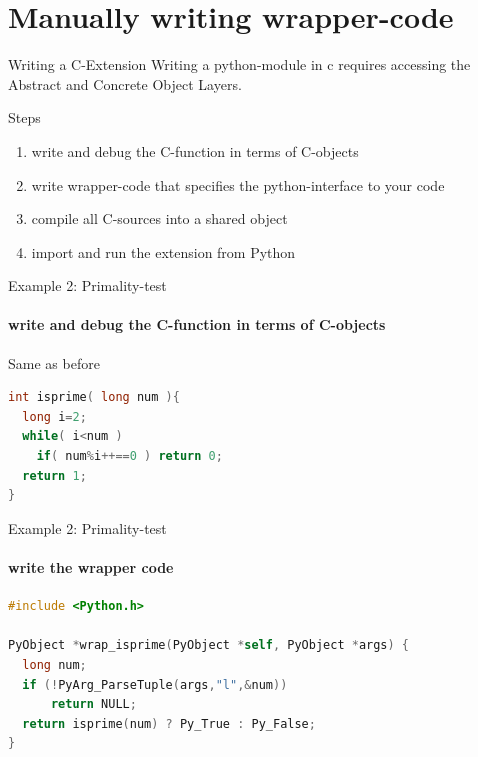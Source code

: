 \documentclass[german]{beamer}
\begin{document}
\section{Manually writing wrapper-code}

\begin{frame}{Writing a C-Extension}
Writing a python-module in c requires accessing the Abstract and
Concrete Object Layers.

  \begin{block}{Steps}
    \begin{enumerate}
    \item write and debug the C-function in terms of C-objects 
    \item write wrapper-code that specifies the python-interface to
      your code
    \item compile all C-sources into a shared object
    \item import and run the extension from Python
    \end{enumerate}
  \end{block}
  
\end{frame}


\begin{frame}[fragile]{Example 2: Primality-test}
  \framesubtitle{write and debug the C-function in terms of C-objects}

  Same as before

  \begin{lstlisting}[language=C,caption=prime.c]
int isprime( long num ){
  long i=2;
  while( i<num )
    if( num%i++==0 ) return 0;
  return 1;
}
  \end{lstlisting}

\end{frame}
\begin{frame}[fragile]{Example 2: Primality-test}
  \framesubtitle{write the wrapper code}

  \begin{lstlisting}[language=C,caption=primewrap.c]
#include <Python.h>

PyObject *wrap_isprime(PyObject *self, PyObject *args) {
  long num;
  if (!PyArg_ParseTuple(args,"l",&num))
      return NULL;
  return isprime(num) ? Py_True : Py_False;
}
  \end{lstlisting}

  
\end{frame}
\end{document}
